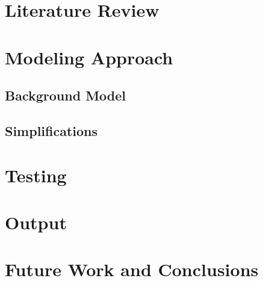 \documentclass[11pt, oneside, notitlepage, openany]{report}
\begin{document}
\chapter{Literature Review}

\chapter{Modeling Approach}
\section{Background Model}

\section{Simplifications}

\chapter{Testing}
\chapter{Output}
\chapter{Future Work and Conclusions}


\appendix
%
\end{document}
